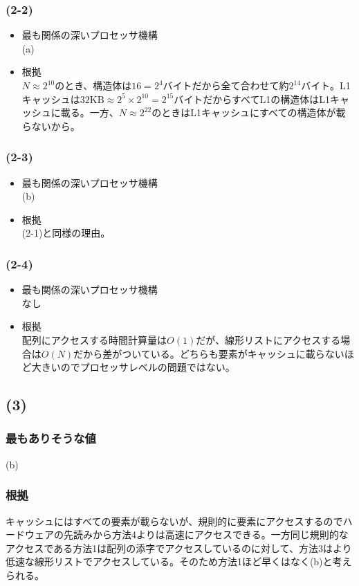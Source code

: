 \documentclass[a4paper,12pt,xelatex,ja=standard]{bxjsarticle}
\begin{document}
\subsubsection*{(2-2)}
\begin{itemize}
  \item{最も関係の深いプロセッサ機構}
  \\
  (a)
  \item{根拠}
  \\
  $N \approx 2^{10}$のとき、構造体は$16 = 2^4$バイトだから全て合わせて約$2^{14}$バイト。L1キャッシュは$32\text{KB} \approx 2^5 \times 2^{10} = 2^{15}\text{バイト}$だからすべてL1の構造体はL1キャッシュに載る。一方、$N \approx 2^{22}$のときはL1キャッシュにすべての構造体が載らないから。
\end{itemize}

\subsubsection*{(2-3)}
\begin{itemize}
  \item{最も関係の深いプロセッサ機構}
  \\
  (b)
  \item{根拠}
  \\
  (2-1)と同様の理由。
\end{itemize}

\subsubsection*{(2-4)}
\begin{itemize}
  \item{最も関係の深いプロセッサ機構}
  \\
  なし
  \item{根拠}
  \\
  配列にアクセスする時間計算量は$O(1)$だが、線形リストにアクセスする場合は$O(N)$だから差がついている。どちらも要素がキャッシュに載らないほど大きいのでプロセッサレベルの問題ではない。
\end{itemize}

\subsection*{(3)}
\subsubsection*{最もありそうな値}
(b)
\subsubsection*{根拠}
キャッシュにはすべての要素が載らないが、規則的に要素にアクセスするのでハードウェアの先読みから方法4よりは高速にアクセスできる。一方同じ規則的なアクセスである方法1は配列の添字でアクセスしているのに対して、方法3はより低速な線形リストでアクセスしている。そのため方法1ほど早くはなく(b)と考えられる。
\end{document}
